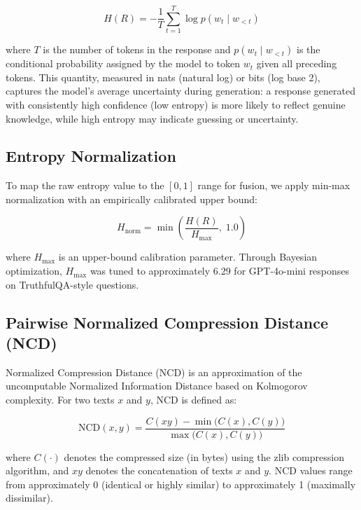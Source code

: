 \begin{equation}
    H(R) = -\frac{1}{T} \sum_{t=1}^{T} \log p(w_t \mid w_{<t})
    \label{eq:token_entropy}
\end{equation}

\noindent
where $T$ is the number of tokens in the response and $p(w_t \mid w_{<t})$ is the conditional probability assigned by the model to token $w_t$ given all preceding tokens. This quantity, measured in nats (natural log) or bits (log base 2), captures the model's average uncertainty during generation: a response generated with consistently high confidence (low entropy) is more likely to reflect genuine knowledge, while high entropy may indicate guessing or uncertainty.

\subsection{Entropy Normalization}

To map the raw entropy value to the $[0, 1]$ range for fusion, we apply min-max normalization with an empirically calibrated upper bound:

\begin{equation}
    H_{\text{norm}} = \min\!\left(\frac{H(R)}{H_{\max}}, \; 1.0\right)
    \label{eq:entropy_norm}
\end{equation}

\noindent
where $H_{\max}$ is an upper-bound calibration parameter. Through Bayesian optimization, $H_{\max}$ was tuned to approximately 6.29 for GPT-4o-mini responses on TruthfulQA-style questions.

\subsection{Pairwise Normalized Compression Distance (NCD)}

Normalized Compression Distance (NCD) \cite{li2008introduction, cilibrasi2005clustering} is an approximation of the uncomputable Normalized Information Distance based on Kolmogorov complexity. For two texts $x$ and $y$, NCD is defined as:

\begin{equation}
    \text{NCD}(x, y) = \frac{C(xy) - \min\!\big(C(x), C(y)\big)}{\max\!\big(C(x), C(y)\big)}
    \label{eq:ncd}
\end{equation}

\noindent
where $C(\cdot)$ denotes the compressed size (in bytes) using the zlib compression algorithm, and $xy$ denotes the concatenation of texts $x$ and $y$. NCD values range from approximately 0 (identical or highly similar) to approximately 1 (maximally dissimilar).

